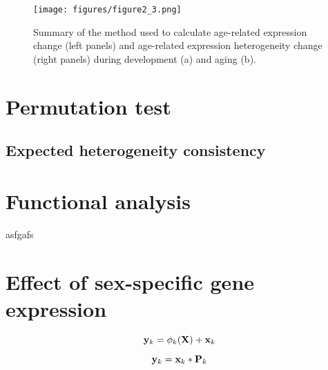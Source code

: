 \begin{figure}[h]
\centering
\texttt{[image: figures/figure2\_3.png]}
\caption{Summary of the method used to calculate age-related expression change (left panels) and age-related expression heterogeneity change (right panels) during development (a) and aging (b).}
\label{fig:fig2.3}
\end{figure}

\section{Permutation test}

\subsection{Expected heterogeneity consistency}

\section{Functional analysis}
asfgafs

\section{Effect of sex-specific gene expression}



\begin{equation}
{\bf y}_k = \phi_k ( {\bf X}) + {\bf x}_k 
\label{eq:prn}
\end{equation}


\begin{equation}
{\bf y}_k = {\bf x}_k * {\bf P}_k
\end{equation}

























